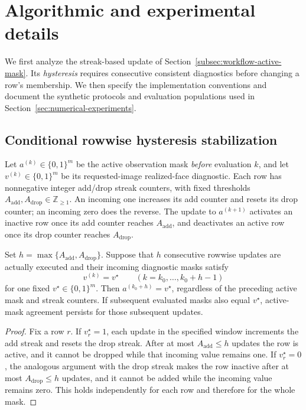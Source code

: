\section{Algorithmic and experimental details}
\label{app:algorithm-details}

We first analyze the streak-based update of Section~\ref{subsec:workflow-active-mask}. Its \emph{hysteresis} requires consecutive consistent diagnostics before changing a row's membership. We then specify the implementation conventions and document the synthetic protocols and evaluation populations used in Section~\ref{sec:numerical-experiments}.

\subsection{Conditional rowwise hysteresis stabilization}
\label{app:algorithm-hysteresis}

Let $a^{(k)}\in\{0,1\}^m$ be the active observation mask \emph{before} evaluation $k$, and let $v^{(k)}\in\{0,1\}^m$ be its requested-image realized-face diagnostic. Each row has nonnegative integer add/drop streak counters, with fixed thresholds $A_{\mathrm{add}},A_{\mathrm{drop}}\in\mathbb Z_{\ge1}$. An incoming one increases its add counter and resets its drop counter; an incoming zero does the reverse. The update to $a^{(k+1)}$ activates an inactive row once its add counter reaches $A_{\mathrm{add}}$, and deactivates an active row once its drop counter reaches $A_{\mathrm{drop}}$.

\begin{proposition}
\label{prop:rowwise-hysteresis}
Set $h=\max\{A_{\mathrm{add}},A_{\mathrm{drop}}\}$. Suppose that $h$ consecutive rowwise updates are actually executed and their incoming diagnostic masks satisfy
\[
v^{(k)}=v^\star
\qquad(k=k_0,\ldots,k_0+h-1)
\]
for one fixed $v^\star\in\{0,1\}^m$. Then $a^{(k_0+h)}=v^\star$, regardless of the preceding active mask and streak counters. If subsequent evaluated masks also equal $v^\star$, active-mask agreement persists for those subsequent updates.
\end{proposition}

\begin{proof}
Fix a row $r$. If $v_r^\star=1$, each update in the specified window increments the add streak and resets the drop streak. After at most $A_{\mathrm{add}}\le h$ updates the row is active, and it cannot be dropped while that incoming value remains one. If $v_r^\star=0$, the analogous argument with the drop streak makes the row inactive after at most $A_{\mathrm{drop}}\le h$ updates, and it cannot be added while the incoming value remains zero. This holds independently for each row and therefore for the whole mask.
\end{proof}


